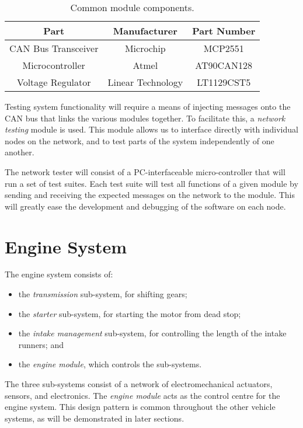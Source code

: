\begin{table}[H]
	\caption{Common module components.}
	\label{table:engine_module_components}
	\centering
	\begin{tabular}{|c|c|c|}
		\hline 
		Part & Manufacturer & Part Number\tabularnewline 
		\hline \hline
		CAN Bus Transceiver & Microchip & MCP2551\tabularnewline \hline
		Microcontroller & Atmel & AT90CAN128\tabularnewline \hline
		Voltage Regulator & Linear Technology & LT1129CST5\tabularnewline		
		\hline
	\end{tabular}
\end{table}

Testing system functionality will require a means of injecting messages onto the CAN bus that links the various modules together. To facilitate this, a \emph{network testing} module is used. This module allows us to interface directly with individual nodes on the network, and to test parts of the system independently of one another. 

The network tester will consist of a PC-interfaceable micro-controller that will run a set of test suites. Each test suite will test all functions of a given module by sending and receiving the expected messages on the network to the module. This will greatly ease the development and debugging of the software on each node.

%
%

\section{Engine System}
\label{sec:engine_system}

The engine system consists of:

\begin{itemize}
\item the \emph{transmission} sub-system, for shifting gears;
\item the \emph{starter} sub-system, for starting the motor from dead stop; 
\item the \emph{intake management} sub-system, for controlling the length of the intake runners; and
\item the \emph{engine module}, which controls the sub-systems.
\end{itemize}

The three sub-systems consist of a network of electromechanical actuators, sensors, and electronics. The \emph{engine module} acts as the control centre for the engine system. This design pattern is common throughout the other vehicle systems, as will be demonstrated in later sections.

